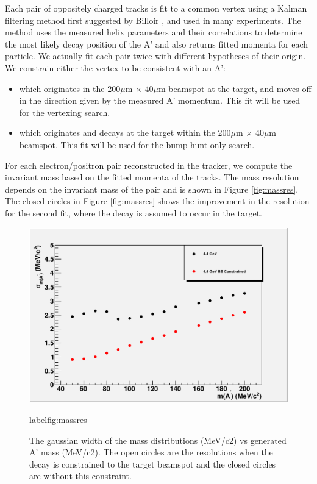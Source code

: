 Each pair of oppositely charged tracks is fit to a common vertex using a Kalman filtering 
method first suggested by Billoir \cite{bf}, \cite{bq} and used in many experiments.  The method 
uses the measured helix parameters and their correlations to determine the most likely 
decay position of the A' and also returns fitted momenta for each particle.  We actually 
fit each pair twice with different hypotheses of their origin.  We constrain either 
the vertex to be consistent with an A':

\begin{itemize}
\item which originates in the 200$\mu$m $\times$ 40$\mu$m beamspot at the target, and moves off 
in the direction given by the measured A' momentum.  This fit will be used for the vertexing search.  
\item which originates and decays at the target within the 200$\mu$m $\times$ 40$\mu$m beamspot.  
This fit will be used for the bump-hunt only search.  
\end{itemize}

For each electron/positron pair reconstructed in the tracker, we compute the invariant mass based 
on the fitted momenta of the tracks.  The mass resolution depends on the invariant mass of the pair 
and is shown in Figure \ref{fig:massres}.  The closed circles  in Figure \ref{fig:massres} shows the improvement 
in the resolution for the second fit, where the decay is assumed to occur in the target.  

\begin{figure}
\includegraphics[scale=0.8]{performance/tracking_performance/massRes-4pt4.pdf}
\caption{The gaussian width of the mass distributions (MeV/c2) vs generated A' mass (MeV/c2). 
 The open circles are the resolutions when the decay is constrained to the target beamspot 
and the closed circles are without this constraint.    }
label{fig:massres}
\end{figure}



